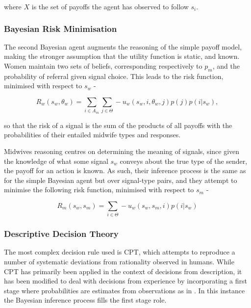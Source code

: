 where $X$ is the set of payoffs the agent has observed to follow $s_{i}$.

\subsubsection{Bayesian Risk Minimisation}

The second Bayesian agent augments the reasoning of the simple payoff model, making the stronger assumption that the utility function is static, and known. Women maintain two sets of beliefs, corresponding respectively to \(p_{m}\), and the probability of referral given signal choice. This leads to the risk function, minimised with respect to \(s_{w}\) -

\begin{equation}
R_{w}(s_{w}, \theta_{w}) = \sum_{i\in A_{m}}\sum_{j\in \Theta} -u_{w}(s_{w}, i, \theta_{w}, j)p(j)p(i | s_{w}),
\end{equation}

so that the risk of a signal is the sum of the products of all payoffs with the probabilities of their entailed midwife types and responses.

Midwives reasoning centres on determining the meaning of signals, since given the knowledge of what some signal \(s_{w}\) conveys about the true type of the sender, the payoff for an action is known. As such, their inference process is the same as for the simple Bayesian agent but over signal-type pairs, and they attempt to minimise the following risk function, minimised with respect to \(s_{m}\) -

\begin{equation}
R_{m}(s_{w}, s_{m}) = \sum_{i\in \Theta} -u_{w}(s_{w}, s_{m}, i)p(i | s_{w})
\end{equation}

\subsubsection{Descriptive Decision Theory}

The most complex decision rule used is \ac{CPT}, which attempts to reproduce a number of systematic deviations from rationality observed in humans. While \ac{CPT} has primarily been applied in the context of decisions from description, it has been modified to deal with decisions from experience by incorporating a first stage where probabilities are estimates from observations as in \cite{FoxCPT}. In this instance the Bayesian inference process fills the first stage role.


